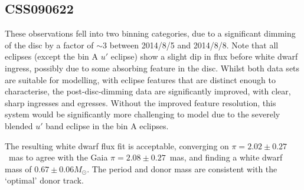 \newpage
\subsection{CSS090622}

These observations fell into two binning categories, due to a significant dimming of the disc by a factor of $\sim 3$ between 2014/8/5 and 2014/8/8. Note that all eclipses (except the bin A $u'$ eclipse) show a slight dip in flux before white dwarf ingress, possibly due to some absorbing feature in the disc.
Whilst both data sets are suitable for modelling, with eclipse features that are distinct enough to characterise, the post-disc-dimming data are significantly improved, with clear, sharp ingresses and egresses. Without the improved feature resolution, this system would be significantly more challenging to model due to the severely blended $u'$ band eclipse in the bin A eclipses.

The resulting white dwarf flux fit is acceptable, converging on $\pi = 2.02\pm0.27$~mas to agree with the Gaia $\pi=2.08\pm0.27$~mas, and finding a white dwarf mass of $0.67\pm0.06 M_\odot$. The period and donor mass are consistent with the `optimal' \citet{knigge11} donor track.

%     

